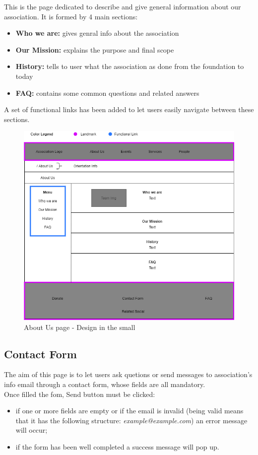 This is the page dedicated to describe and give general information about our association. It is formed by 4 main sections: 
\begin{itemize}
	\item \textbf{Who we are: } gives genral info about the association
	\item \textbf{Our Mission: } explains the purpose and final scope
	\item \textbf{History: } tells to user what the association as done from the foundation to today
	\item \textbf{FAQ: } contains some common questions and related answers
\end{itemize}
A set of functional links has been added to let users easily navigate between these sections.

\begin{figure}[h!]
	\centering
	\begin{minipage}[b]{1\textwidth}
    		\includegraphics[width=\textwidth]{./assets/aboutus.png}
		\caption{About Us page - Design in the small}
	\end{minipage}
\end{figure}
\FloatBarrier
\clearpage


\subsection{Contact Form}
The aim of this page is to let users ask quetions or send messages to association's info email through a contact form, whose fields are all mandatory. \\
Once filled the fom, Send button must be clicked:
\begin{itemize}
	\item if one or more fields are empty or if the email is invalid (being valid means that it has the following structure: 				\emph{example@example.com}) an error message will occur;
	\item if the form has been well completed a success message will pop up.
\end{itemize}

